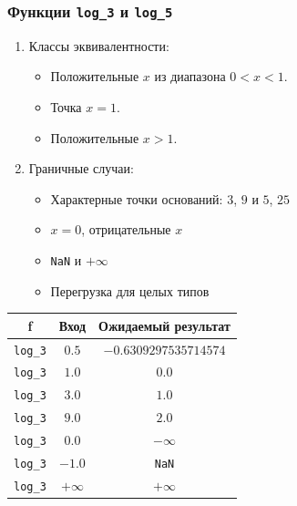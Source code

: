 \documentclass[12pt,a4paper]{report}
\begin{document}
\subsubsection*{Функции \texttt{log\_3} и \texttt{log\_5}}
\begin{enumerate}
    \item Классы эквивалентности:
          \begin{itemize}
              \item Положительные $x$ из диапазона $0 < x < 1$.
              \item Точка $x=1$.
              \item Положительные $x > 1$.
          \end{itemize}
    \item Граничные случаи:
          \begin{itemize}
              \item Характерные точки оснований: $3$, $9$ и $5$, $25$
              \item $x=0$, отрицательные $x$
              \item \texttt{NaN} и $+\infty$
              \item Перегрузка для целых типов
          \end{itemize}
\end{enumerate}
\begin{center}
    \begin{tabular}{|c|c|c|}
        \hline
        \textbf{f} & \textbf{Вход} & \textbf{Ожидаемый результат} \\
        \hline
        \texttt{log\_3} & $0.5$ & $-0.6309297535714574$ \\
        \hline
        \texttt{log\_3} & $1.0$ & $0.0$ \\
        \hline
        \texttt{log\_3} & $3.0$ & $1.0$ \\
        \hline
        \texttt{log\_3} & $9.0$ & $2.0$ \\
        \hline
        \texttt{log\_3} & $0.0$ & $-\infty$ \\
        \hline
        \texttt{log\_3} & $-1.0$ & \texttt{NaN} \\
        \hline
        \texttt{log\_3} & $+\infty$ & $+\infty$ \\
        \hline
    \end{tabular}
\end{center}
\end{document}
